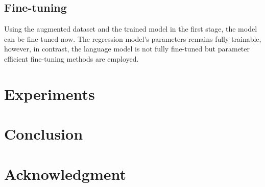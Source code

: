 \documentclass[10pt,conference,compsocconf]{IEEEtran}
\begin{document}
\subsection{Fine-tuning}\label{sec: Fine-tuning}

Using the augmented dataset and the trained model in the first stage, the model can be fine-tuned now. The regression model's parameters remains fully trainable, however, in contrast, the language model is not fully fine-tuned but parameter efficient fine-tuning methods are employed.

\section{Experiments}\label{sec: Experiments}



\section{Conclusion}\label{sec: Conclusion}



\section*{Acknowledgment}





\end{document}
